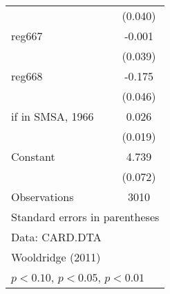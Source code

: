 \begin{table}[htbp]
\begin{tabular}{l*{1}{c}}
                    &     (0.040)         \\
\addlinespace
reg667              &      -0.001         \\
                    &     (0.039)         \\
\addlinespace
reg668              &      -0.175\sym{***}\\
                    &     (0.046)         \\
\addlinespace
=1 if in SMSA, 1966 &       0.026         \\
                    &     (0.019)         \\
\addlinespace
Constant            &       4.739\sym{***}\\
                    &     (0.072)         \\
\midrule
Observations        &        3010         \\
\bottomrule
\multicolumn{2}{l}{\footnotesize Standard errors in parentheses}\\
\multicolumn{2}{l}{\footnotesize Data: CARD.DTA}\\
\multicolumn{2}{l}{\footnotesize Wooldridge (2011)}\\
\multicolumn{2}{l}{\footnotesize \sym{*} \(p<0.10\), \sym{**} \(p<0.05\), \sym{***} \(p<0.01\)}\\
\end{tabular}
\end{table}
